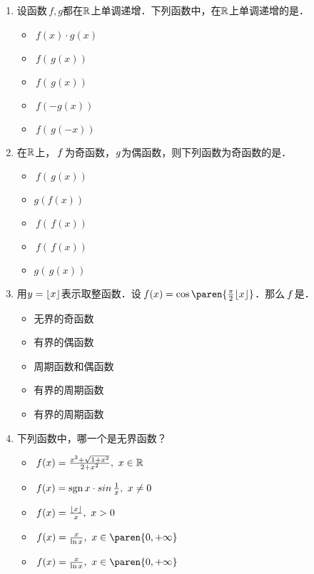 \begin{enumerate}
\item 设函数\(\,f, g\)都在\(\mathbb{R}\)上单调递增．下列函数中，在\(\mathbb{R}\)上单调递增的是\uline{\makebox[3em]{}}．
  \begin{itemize}
    \renewcommand{\labelitemi}{\faCircleThin}
  \item \(\,f(x) \cdot g(x)\)
    \ifshowsol
    \item[\faCircle] \(\,f(\,g(x))\)
    \else
    \item \(\,f(\,g(x))\)
    \fi
  \item \(\,f(-g(x))\)
  \item \(\,f(\,g(-x))\)
  \end{itemize}

\item 在\(\mathbb{R}\)上，\(\,f\mkern2mu\)为奇函数，\(\mkern1mu g\)为偶函数，则下列函数为奇函数的是\uline{\makebox[3em]{}}．
  \begin{itemize}
    \renewcommand{\labelitemi}{\faCircleThin}
  \item \(\,f(\,g(x))\)
  \item \(g(f(x))\)
    \ifshowsol
    \item[\faCircle] \(\,f(\,f(x))\)
    \else
    \item \(\,f(\,f(x))\)
    \fi
  \item \(g(\,g(x))\)
  \end{itemize}

\item 用\(y = \lfloor x\rfloor\)表示取整函数．设\(\,f(x) = \cos\paren{\frac\pi2 \floor x}\)．那么\(\,f\mkern2mu\)是\uline{\makebox[4em]{}}．
  \begin{itemize}
    \renewcommand{\labelitemi}{\faCircleThin}
  \item 无界的奇函数
  \item 有界的偶函数
  \item 周期函数和偶函数
    \ifshowsol
    \item[\faCircle] 有界的周期函数
    \else
    \item 有界的周期函数
    \fi
  \end{itemize}

\item 下列函数中，哪一个是无界函数？
  \begin{itemize}
    \renewcommand{\labelitemi}{\faCircleThin}
  \item \(\,f(x) = \frac{x^2 + \sqrt{1+x^2}}{2 + x^2},\ x \in \mathbb{R}\)
  \item \(\,f(x) = \operatorname{sgn} x \cdot \operatorname{\smash{sin}} \frac1x,\ x \ne 0\)
  \item \(\,f(x) = \frac{\lfloor x\rfloor}{x},\ x > 0\)
    \ifshowsol
    \item[\faCircle] \(\,f(x) = \frac{x}{\ln x},\ x \in \paren{0,+\infty}\)
    \else
    \item \(\,f(x) = \frac{x}{\ln x},\ x \in \paren{0,+\infty}\)
    \fi
  \end{itemize}


\end{enumerate}

